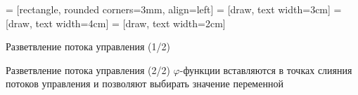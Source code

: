 \documentclass[aspectratio=169
  , xcolor={svgnames}
  , hyperref={ colorlinks,citecolor=DeepPink4
             , linkcolor=DarkRed,urlcolor=DarkBlue}
  , russian
  ]{beamer}
\theoremstyle{exerciseStyle1}
\begin{document}
 = [rectangle, rounded corners=3mm, align=left]
 = [draw, text width=3cm]
 = [draw, text width=4cm]
 = [draw, text width=2cm]

\begin{frame}[fragile]{Разветвление потока управления (1/2)}
\begin{minipage}[t]{0.48\linewidth}
\begin{figure}

\end{figure}
\end{minipage}\vspace{1em}

\end{frame}

\begin{frame}[fragile]{Разветвление потока управления (2/2)}
$\varphi$-функции вставляются в точках слияния потоков управления и позволяют выбирать значение переменной

\begin{minipage}[t]{0.48\linewidth}
\begin{figure}

\end{figure}
\end{minipage}

\end{frame}
\end{document}
